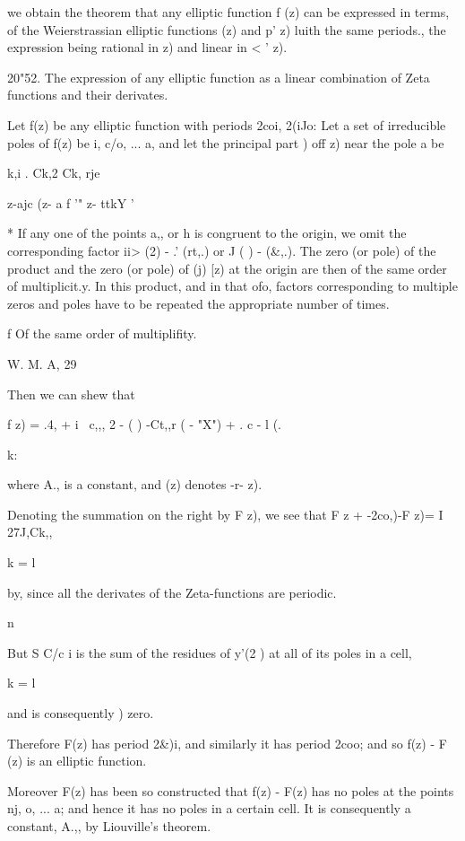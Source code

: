 {we obtain the theorem that any elliptic function f (z) can be
expressed in terms, of the Weierstrassian elliptic functions (z) and
p' z) luith the same periods., the expression being rational in z) and
linear in < ' z).

20"52. The expression of any elliptic function as a linear combination
of Zeta functions and their derivates.

Let f(z) be any elliptic function with periods 2coi, 2(iJo: Let a set
of irreducible poles of f(z) be i, c/o, ... a, and let the principal
part ) off z) near the pole a be

 k,i . Ck,2 Ck, rje

z-ajc (z- a f '" z- ttkY '

* If any one of the points a,, or h is congruent to the origin, we
omit the corresponding factor ii> (2) - .' (rt,.) or J ( ) - (\&,.).
The zero (or pole) of the product and the zero (or pole) of (j) [z) at
the origin are then of the same order of multiplicit.y. In this
product, and in that ofo, factors corresponding to multiple
zeros and poles have to be repeated the appropriate number of times.

f Of the same order of multiplifity.

W. M. A, 29

%
%

Then we can shew that

f z) = .4, + i \ c,,, 2 - ( ) -Ct,,r ( - "X") + . c - l (.

k:

where A., is a constant, and (z) denotes -r- z).

Denoting the summation on the right by F z), we see that F z +
-2co,)-F z)= I 27J,Ck,,

k = l

by, since all the derivates of the Zeta-functions are
periodic.

n

But S C/c i is the sum of the residues of y'(2 ) at all of its poles
in a cell,

k = l

and is consequently ) zero.

Therefore F(z) has period 2\&)i, and similarly it has period 2coo; and
so f(z) - F (z) is an elliptic function.

Moreover F(z) has been so constructed that f(z) - F(z) has no poles at
the points nj, o, ... a; and hence it has no poles in a certain cell.
It is consequently a constant, A.,, by Liouville's theorem.

}

